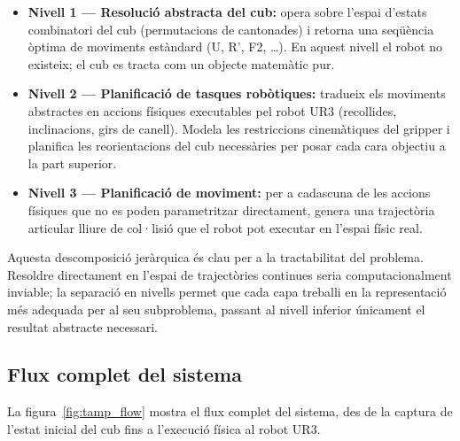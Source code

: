 \documentclass[12pt, a4paper]{article}
\begin{document}
\begin{itemize}
  \item \textbf{Nivell 1 — Resolució abstracta del cub:} opera sobre l'espai d'estats combinatori del cub (permutacions de cantonades) i retorna una seqüència òptima de moviments estàndard (U, R', F2, \ldots). En aquest nivell el robot no existeix; el cub es tracta com un objecte matemàtic pur.

  \item \textbf{Nivell 2 — Planificació de tasques robòtiques:} tradueix els moviments abstractes en accions físiques executables pel robot UR3 (recollides, inclinacions, girs de canell). Modela les restriccions cinemàtiques del gripper i planifica les reorientacions del cub necessàries per posar cada cara objectiu a la part superior.

  \item \textbf{Nivell 3 — Planificació de moviment:} per a cadascuna de les accions físiques que no es poden parametritzar directament, genera una trajectòria articular lliure de col·lisió que el robot pot executar en l'espai físic real.
\end{itemize}

Aquesta descomposició jeràrquica és clau per a la tractabilitat del problema. Resoldre directament en l'espai de trajectòries continues seria computacionalment inviable; la separació en nivells permet que cada capa treballi en la representació més adequada per al seu subproblema, passant al nivell inferior únicament el resultat abstracte necessari.

\subsection{Flux complet del sistema}

La figura~\ref{fig:tamp_flow} mostra el flux complet del sistema, des de la captura de l'estat inicial del cub fins a l'execució física al robot UR3.
\end{document}
